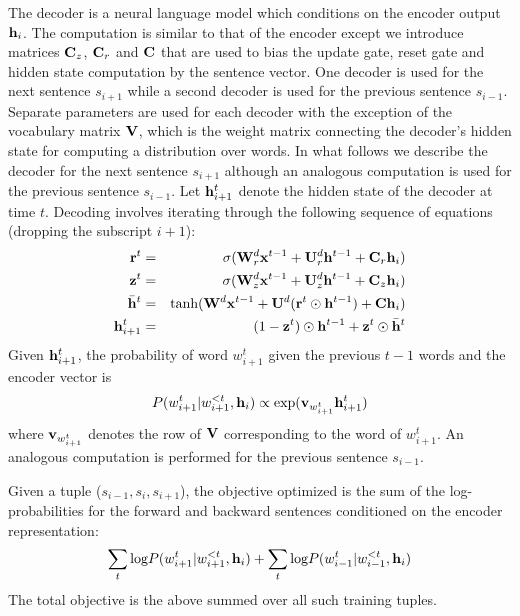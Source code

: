 \documentclass{article} \usepackage{nips15submit_e,times}
\begin{document}
 The decoder is a neural language model which conditions on the encoder output ${\bf h}_i$. The computation is similar to that of the encoder except we introduce matrices ${\bf C}_z$, ${\bf C}_r$ and ${\bf C}$ that are used to bias the update gate, reset gate and hidden state computation by the sentence vector. One decoder is used for the next sentence $s_{i+1}$ while a second decoder is used for the previous sentence $s_{i-1}$. Separate parameters are used for each decoder with the exception of the vocabulary matrix ${\bf V}$, which is the weight matrix connecting the decoder's hidden state for computing a distribution over words. In what follows we describe the decoder for the next sentence $s_{i+1}$ although an analogous computation is used for the previous sentence $s_{i-1}$. Let ${\bf h}^t_{i+1}$ denote the hidden state of the decoder at time $t$. Decoding involves iterating through the following sequence of equations (dropping the subscript $i+1$):
\begin{eqnarray}
{\bf r}^t &=& \sigma ( {\bf W}_r^d {\bf x}^{t-1} + {\bf U}_r^d {\bf h}^{t-1} + {\bf C}_r {\bf h}_i ) \\
{\bf z}^t &=& \sigma ( {\bf W}_z^d {\bf x}^{t-1} + {\bf U}_z^d {\bf h}^{t-1} + {\bf C}_z {\bf h}_i ) \\
\bar{{\bf h}}^t &=& \text{tanh} ( {\bf W}^d {\bf x}^{t-1} + {\bf U}^d ( {\bf r}^t \odot {\bf h}^{t-1} ) + {\bf C} {\bf h}_i) \\
{\bf h}^t_{i+1} &=& (1 - {\bf z}^t) \odot {\bf h}^{t-1} + {\bf z}^t \odot \bar{{\bf h}}^t
\end{eqnarray}
Given ${\bf h}^t_{i+1}$, the probability of word $w_{i+1}^t$ given the previous $t-1$ words and the encoder vector is
\begin{equation}
P(w_{i+1}^t | w_{i+1}^{<t}, {\bf h}_i) \propto \text{exp} ( {\bf v}_{w_{i+1}^t} {\bf h}^t_{i+1} )
\end{equation}
where ${\bf v}_{w_{i+1}^t}$ denotes the row of ${\bf V}$ corresponding to the word of $w_{i+1}^t$. An analogous computation is performed for the previous sentence $s_{i-1}$.

 Given a tuple ($s_{i-1}, s_i, s_{i+1}$), the objective optimized is the sum of the log-probabilities for the forward and backward sentences conditioned on the encoder representation:
\begin{equation}
\sum_t \text{log} P(w_{i+1}^t | w_{i+1}^{<t}, {\bf h}_i) + \sum_t \text{log} P(w_{i-1}^t | w_{i-1}^{<t}, {\bf h}_i)
\end{equation}
The total objective is the above summed over all such training tuples.
\end{document}
